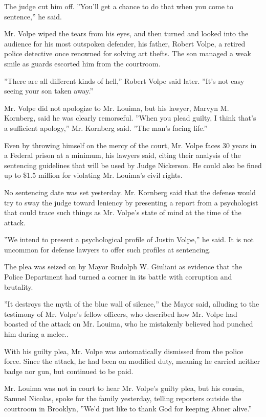 The judge cut him off. ''You'll get a chance to do that when you come to
sentence,'' he said.

Mr. Volpe wiped the tears from his eyes, and then turned and looked into
the audience for his most outspoken defender, his father, Robert Volpe,
a retired police detective once renowned for solving art thefts. The son
managed a weak smile as guards escorted him from the courtroom.

''There are all different kinds of hell,'' Robert Volpe said later.
''It's not easy seeing your son taken away.''

Mr. Volpe did not apologize to Mr. Louima, but his lawyer, Marvyn M.
Kornberg, said he was clearly remorseful. ''When you plead guilty, I
think that's a sufficient apology,'' Mr. Kornberg said. ''The man's
facing life.''

Even by throwing himself on the mercy of the court, Mr. Volpe faces 30
years in a Federal prison at a minimum, his lawyers said, citing their
analysis of the sentencing guidelines that will be used by Judge
Nickerson. He could also be fined up to \$1.5 million for violating Mr.
Louima's civil rights.

No sentencing date was set yesterday. Mr. Kornberg said that the defense
would try to sway the judge toward leniency by presenting a report from
a psychologist that could trace such things as Mr. Volpe's state of mind
at the time of the attack.

''We intend to present a psychological profile of Justin Volpe,'' he
said. It is not uncommon for defense lawyers to offer such profiles at
sentencing.

The plea was seized on by Mayor Rudolph W. Giuliani as evidence that the
Police Department had turned a corner in its battle with corruption and
brutality.

''It destroys the myth of the blue wall of silence,'' the Mayor said,
alluding to the testimony of Mr. Volpe's fellow officers, who described
how Mr. Volpe had boasted of the attack on Mr. Louima, who he mistakenly
believed had punched him during a melee..

With his guilty plea, Mr. Volpe was automatically dismissed from the
police force. Since the attack, he had been on modified duty, meaning he
carried neither badge nor gun, but continued to be paid.

Mr. Louima was not in court to hear Mr. Volpe's guilty plea, but his
cousin, Samuel Nicolas, spoke for the family yesterday, telling
reporters outside the courtroom in Brooklyn, ''We'd just like to thank
God for keeping Abner alive.''


